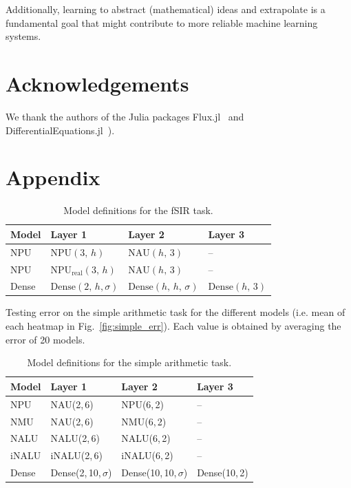 \documentclass[9pt]{article}
\newcommand{\npu}{\text{NPU}}
\newcommand{\nau}{\text{NAU}}
\newcommand{\dense}{\text{Dense}}
\begin{document}
Additionally, learning to abstract (mathematical) ideas and extrapolate is a
fundamental goal that might contribute to more reliable machine learning
systems.

\section{Acknowledgements}%
\label{sec:acknowledgements}

We thank the authors of the Julia packages
Flux.jl~\citep{innes_fashionable_2018} and
DifferentialEquations.jl~\citep{rackauckas_differentialequationsjl_2017}).




\newpage
\appendix
\section*{Appendix}%
\label{sec:appendix}

\setcounter{table}{0}
\renewcommand{\thetable}{A\arabic{table}}

\begin{table}[h]
  \centering
  \caption{Model definitions for the fSIR task.}
  \label{tab:fsir_models}
  \begin{tabular}{llll}
    \toprule
    Model & Layer 1 & Layer 2 & Layer 3 \\
    \midrule
    NPU & $\npu(3,\,h)$ & $\nau(h,\,3)$ & -- \\
    NPU & NPU$_{\text{real}}(3,\,h)$ & $\nau(h,\,3)$ & -- \\
    Dense & $\dense(2,\,h,\sigma)$ & $\dense(h,\,h,\,\sigma)$ & $\dense(h,\,3)$ \\
    \bottomrule
  \end{tabular}
\end{table}



\begin{table}[h]
  \centering
  \caption{Testing error on the simple arithmetic task for the different models
  (i.e. mean of each heatmap in Fig.~\ref{fig:simple_err}). Each value is
  obtained by averaging the error of 20 models.}
  \label{tab:simple_err}
  
\end{table}


\begin{table}[h]
  \centering
  \caption{Model definitions for the simple arithmetic task.}
  \label{tab:models_simple_task}
  \begin{tabular}{llll}
    \toprule
    Model & Layer 1 & Layer 2 & Layer 3 \\
    \midrule
    NPU & NAU(2,\,6) & NPU(6,\,2) & -- \\
    NMU & NAU(2,\,6) & NMU(6,\,2) & -- \\
    NALU & NALU(2,\,6) & NALU(6,\,2) & -- \\
    iNALU & iNALU(2,\,6) & iNALU(6,\,2) & -- \\
    Dense & Dense(2,\,10,\,$\sigma$) & Dense(10,\,10,\,$\sigma$) & Dense(10,\,2) \\
    \bottomrule
  \end{tabular}
\end{table}
\end{document}
